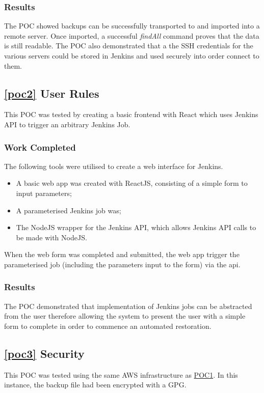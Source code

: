 	\subsubsection{Results}
  The POC showed backups can be successfully transported to and imported into a remote server. Once imported, a successful \textit{findAll} command proves that the data is still readable. The POC also demonstrated that a the SSH credentials for the various servers could be stored in Jenkins and used securely into order connect to them.
  
\subsection{\ref{poc2} User Rules}
	This POC was tested by creating a basic frontend with React which uses Jenkins API to trigger an arbitrary Jenkins Job.
	
	\subsubsection{Work Completed}
  The following tools were utilised to create a web interface for Jenkins.
  \begin{itemize}
    \item A basic web app was created with ReactJS, consisting of a simple form to input parameters;
    \item A parameterised Jenkins job was;
    \item The NodeJS wrapper for the Jenkins API, which allows Jenkins API calls to be made with NodeJS.
  \end{itemize}
  When the web form was completed and submitted, the web app trigger the parameterised job (including the parameters input to the form) via the api.

  \subsubsection{Results}
  The POC demonstrated that implementation of Jenkins jobs can be abstracted from the user therefore allowing the system to present the user with a simple form to complete in order to commence an automated restoration.

\subsection{\ref{poc3} Security}
  This POC was tested using the same AWS infrastructure as \hyperref[poc1]{POC1}. In this instance, the backup file had been encrypted with a GPG.


